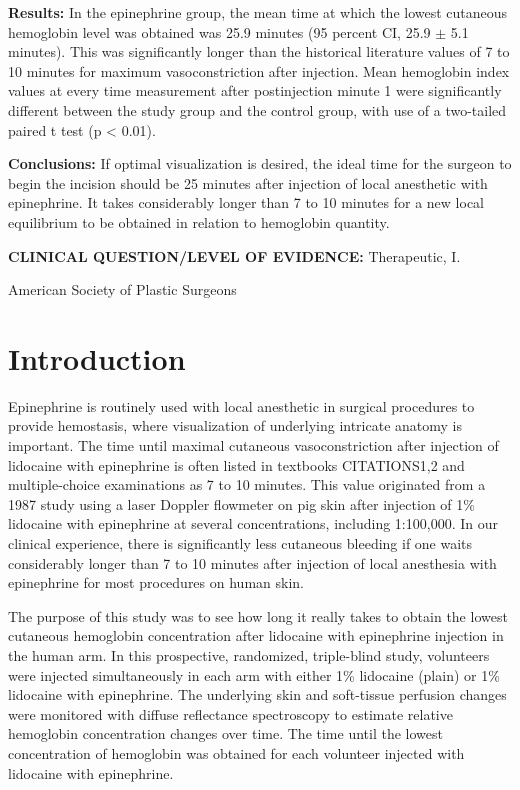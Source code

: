\textbf{Results:} In the epinephrine group, the mean time at which the lowest cutaneous hemoglobin level was obtained was 25.9 minutes (95 percent CI, 25.9 $\pm$ 5.1 minutes). This was significantly longer than the historical literature values of 7 to 10 minutes for maximum vasoconstriction after injection. Mean hemoglobin index values at every time measurement after postinjection minute 1 were significantly different between the study group and the control group, with use of a two-tailed paired t test (p < 0.01).

\textbf{Conclusions:} If optimal visualization is desired, the ideal time for the surgeon to begin the incision should be 25 minutes after injection of local anesthetic with epinephrine. It takes considerably longer than 7 to 10 minutes for a new local equilibrium to be obtained in relation to hemoglobin quantity.

\textbf{CLINICAL QUESTION/LEVEL OF EVIDENCE:} Therapeutic, I.

\noindent {} American Society of Plastic Surgeons

\section{Introduction}
Epinephrine is routinely used with local anesthetic in surgical procedures to provide hemostasis, where visualization of underlying intricate anatomy is important. The time until maximal cutaneous vasoconstriction after injection of lidocaine with epinephrine is often listed in textbooks CITATIONS1,2 and multiple-choice examinations as 7 to 10 minutes. This value originated from a 1987 study using a laser Doppler flowmeter on pig skin after injection of 1\% lidocaine with epinephrine at several concentrations, including 1:100,000.\cite{Larrabee1987} In our clinical experience, there is significantly less cutaneous bleeding if one waits considerably longer than 7 to 10 minutes after injection of local anesthesia with epinephrine for most procedures on human skin.

The purpose of this study was to see how long it really takes to obtain the lowest cutaneous hemoglobin concentration after lidocaine with epinephrine injection in the human arm. In this prospective, randomized, triple-blind study, volunteers were injected simultaneously in each arm with either 1\% lidocaine (plain) or 1\% lidocaine with epinephrine. The underlying skin and soft-tissue perfusion changes were monitored with diffuse reflectance spectroscopy to estimate relative hemoglobin concentration changes over time. The time until the lowest concentration of hemoglobin was obtained for each volunteer injected with lidocaine with epinephrine.

